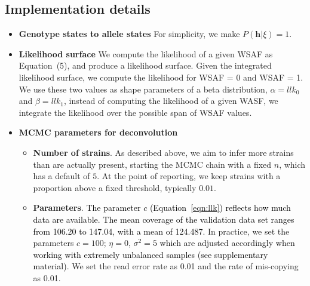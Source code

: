 \documentclass[9pt]{article}
\begin{document}
\subsection{Implementation details}
\begin{itemize}
  \item {\bf Genotype states to allele states} For simplicity, we make $P(\mathbf{h} | \xi) = 1$.





  \item {\bf Likelihood surface} We compute the likelihood of a given WSAF as \cite{Zhu2017} Equation~(5), and produce a likelihood surface. Given the integrated likelihood surface, we compute the likelihood for WSAF = 0 and WSAF = 1. We use these two values as shape parameters of a beta distribution, $\alpha = llk_{0}$ and $\beta = llk_{1}$, instead of computing the likelihood of a given WASF, we integrate the likelihood over the possible span of WSAF values.


\item {\bf MCMC parameters for deconvolution}

\begin{itemize}
\item {\bf Number of strains}. As described above, we aim to infer more strains than are actually present, starting the MCMC chain with a fixed $n$, which has a default of $5$. At the point of reporting, we keep strains with a proportion above a fixed threshold, typically $0.01$.

\item {\bf Parameters}. \textcolor{black}{The parameter $c$ (Equation~\eqref{eqn:llk}) reflects how much data are available. The mean coverage of the validation data set ranges from 106.20 to 147.04, with a mean of 124.487.} In practice, we set the parameters $c=100$; $\eta = 0$, \textcolor{black}{$\sigma^2 = 5$ which are adjusted accordingly when working with extremely unbalanced samples (see \citet{Zhu2017} supplementary material)}.  We set the read error rate as 0.01 and the rate of mis-copying as 0.01.


\end{itemize}
\end{itemize}
\end{document}
